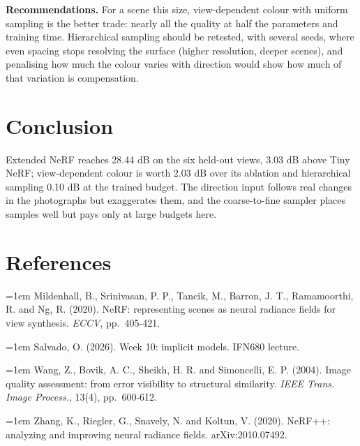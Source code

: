 \documentclass[10pt,a4paper,twocolumn]{article}
\begin{document}
\textbf{Recommendations.} For a scene this size, view-dependent colour with uniform sampling is the better trade: nearly all the quality at half the parameters and training time. Hierarchical sampling should be retested, with several seeds, where even spacing stops resolving the surface (higher resolution, deeper scenes), and penalising how much the colour varies with direction would show how much of that variation is compensation.

\section{Conclusion}
Extended NeRF reaches 28.44 dB on the six held-out views, 3.03 dB above Tiny NeRF; view-dependent colour is worth 2.03 dB over its ablation and hierarchical sampling 0.10 dB at the trained budget. The direction input follows real changes in the photographs but exaggerates them, and the coarse-to-fine sampler places samples well but pays only at large budgets here.

\section*{References}
\footnotesize
\setlength{\parindent}{0pt}
\newcommand{\bib}[1]{\par\hangindent=1em #1}
\bib{Mildenhall, B., Srinivasan, P. P., Tancik, M., Barron, J. T., Ramamoorthi, R. and Ng, R.
(2020). NeRF: representing scenes as neural radiance fields for view synthesis. \emph{ECCV},
pp.~405-421.}
\bib{Salvado, O. (2026). Week 10: implicit models. IFN680 lecture.}
\bib{Wang, Z., Bovik, A. C., Sheikh, H. R. and Simoncelli, E. P. (2004). Image quality assessment:
from error visibility to structural similarity. \emph{IEEE Trans. Image Process.}, 13(4),
pp.~600-612.}
\bib{Zhang, K., Riegler, G., Snavely, N. and Koltun, V. (2020). NeRF++: analyzing and improving neural radiance fields. arXiv:2010.07492.}
\end{document}
